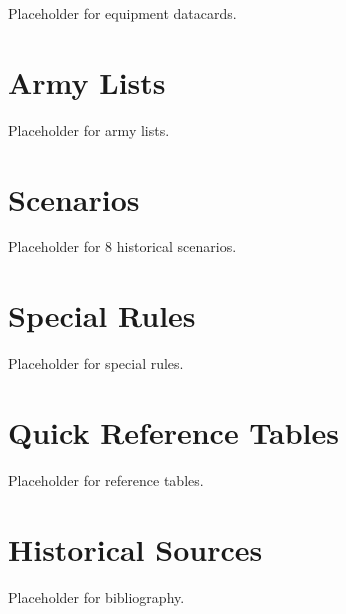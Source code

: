\documentclass[11pt,letterpaper,twoside]{book}
\begin{document}
Placeholder for equipment datacards.

\chapter{Army Lists}

Placeholder for army lists.

\chapter{Scenarios}

Placeholder for 8 historical scenarios.

\chapter{Special Rules}

Placeholder for special rules.

\appendix

\chapter{Quick Reference Tables}

Placeholder for reference tables.

\chapter{Historical Sources}

Placeholder for bibliography.
\end{document}
